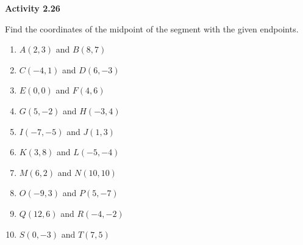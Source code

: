 \vspace{0.3ex}
\noindent\textbf{Activity 2.26}

\vspace{0.2ex}

Find the coordinates of the midpoint of the segment with the given endpoints.
\begin{multicols}{2}
\begin{enumerate}
    \item $A(2,3)$ and $B(8,7)$
    \item $C(-4,1)$ and $D(6,-3)$
    \item $E(0,0)$ and $F(4,6)$
    \item $G(5,-2)$ and $H(-3,4)$
    \item $I(-7,-5)$ and $J(1,3)$
    \item $K(3,8)$ and $L(-5,-4)$
    \item $M(6,2)$ and $N(10,10)$
    \item $O(-9,3)$ and $P(5,-7)$
    \item $Q(12,6)$ and $R(-4,-2)$
    \item $S(0,-3)$ and $T(7,5)$
\end{enumerate}
\end{multicols}
